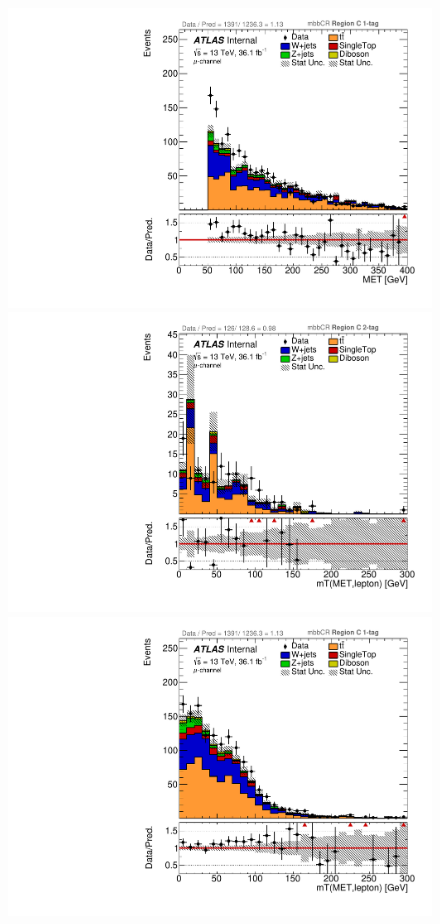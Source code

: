 \begin{figure}[!htbp]
\begin{center}
\includegraphics[scale=0.33]{./figures/boosted/ABCD_ScaledPrompt/muon_mbbcr_RegionC_1tag_MET}\\
\includegraphics[scale=0.33]{./figures/boosted/ABCD_ScaledPrompt/muon_mbbcr_RegionC_WlepMtATLAS}
\includegraphics[scale=0.33]{./figures/boosted/ABCD_ScaledPrompt/muon_mbbcr_RegionC_1tag_WlepMtATLAS}\\

\end{center}
\end{figure}
